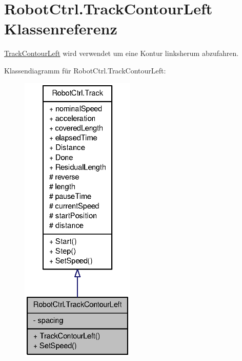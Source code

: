 \hypertarget{class_robot_ctrl_1_1_track_contour_left}{
\section{RobotCtrl.TrackContourLeft Klassenreferenz}
\label{class_robot_ctrl_1_1_track_contour_left}
}


\hyperlink{class_robot_ctrl_1_1_track_contour_left}{TrackContourLeft} wird verwendet um eine Kontur linksherum abzufahren.  




Klassendiagramm für RobotCtrl.TrackContourLeft:\nopagebreak
\begin{figure}[H]
\begin{center}
\leavevmode
\includegraphics[height=400pt]{class_robot_ctrl_1_1_track_contour_left__inherit__graph}
\end{center}
\end{figure}


